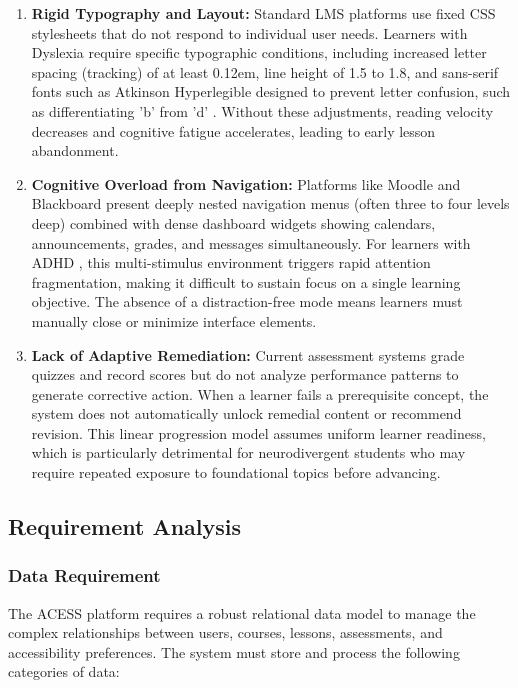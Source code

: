 \documentclass[12pt, oneside]{article} %
\begin{document}
\begin{enumerate}
    \item \textbf{Rigid Typography and Layout:} Standard LMS platforms use fixed CSS stylesheets that do not respond to individual user needs. Learners with Dyslexia require specific typographic conditions, including increased letter spacing (tracking) of at least 0.12em, line height of 1.5 to 1.8, and sans-serif fonts such as Atkinson Hyperlegible \cite{atkinson2021atkinson} designed to prevent letter confusion, such as differentiating 'b' from 'd' \cite{batanero2014accessibility}. Without these adjustments, reading velocity decreases and cognitive fatigue accelerates, leading to early lesson abandonment.
    \item \textbf{Cognitive Overload from Navigation:} Platforms like Moodle and Blackboard present deeply nested navigation menus (often three to four levels deep) combined with dense dashboard widgets showing calendars, announcements, grades, and messages simultaneously. For learners with ADHD \cite{barkley1997adhd}, this multi-stimulus environment triggers rapid attention fragmentation, making it difficult to sustain focus on a single learning objective. The absence of a distraction-free mode means learners must manually close or minimize interface elements.
    \item \textbf{Lack of Adaptive Remediation:} Current assessment systems grade quizzes and record scores but do not analyze performance patterns to generate corrective action. When a learner fails a prerequisite concept, the system does not automatically unlock remedial content or recommend revision. This linear progression model assumes uniform learner readiness, which is particularly detrimental for neurodivergent students who may require repeated exposure to foundational topics before advancing.
\end{enumerate}

\subsection{Requirement Analysis}

\subsubsection{Data Requirement}

The ACESS platform requires a robust relational data model to manage the complex relationships between users, courses, lessons, assessments, and accessibility preferences. The system must store and process the following categories of data:
\end{document}
